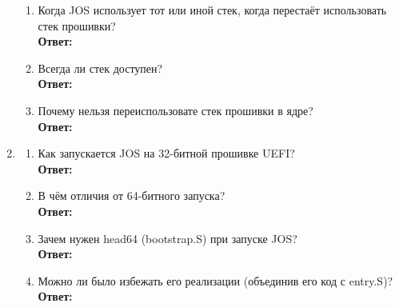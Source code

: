 \documentclass[a4paper,12pt]{article}
\begin{document}
\begin{enumerate}
\begin{enumerate}
		
		\item Когда JOS использует тот или иной стек, когда перестаёт использовать стек прошивки?\\
		\textbf{Ответ:}\\
		
		
		\item Всегда ли стек доступен?\\
		\textbf{Ответ:}\\
		
		
		\item Почему нельзя переиспользовате стек прошивки в ядре?\\
		\textbf{Ответ:}\\
		
		
		\end{enumerate}
	\item \begin{enumerate}
		\item Как запускается JOS на 32-битной прошивке UEFI?\\
		\textbf{Ответ:}\\
		
		
		\item В чём отличия от 64-битного запуска?\\
		\textbf{Ответ:}\\
		
		
		\item Зачем нужен head64 (bootstrap.S) при запуске JOS?\\
		\textbf{Ответ:}\\
		
		
		\item Можно ли было избежать его реализации (объединив его код с entry.S)?\\
		\textbf{Ответ:}\\
		
		
		\end{enumerate}
	\end{enumerate}
\end{document}
